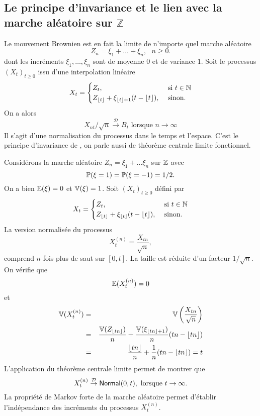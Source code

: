 \subsection{Le principe d'invariance et le lien avec la marche aléatoire sur $\mathbb{Z}$}
Le mouvement Brownien est en fait la limite de n'importe quel marche aléatoire 
$$
Z_n = \xi_1+\ldots+ \xi_n,\text{ }n\geq 0.
$$
dont les incréments $\xi_1,\ldots, \xi_n$ sont \iid de moyenne $0$ et de variance $1$. Soit le processus $(X_t)_{t\geq 0}$ issu d'une interpolation linéaire
$$
X_t = \begin{cases}
Z_t,&\text{ si }t\in \mathbb{N}\\
Z_{\lfloor t\rfloor} + \xi_{\lfloor t\rfloor +1}(t-\lfloor t\rfloor),&\text{ sinon.}
\end{cases}  
$$ 
On a alors 
$$
X_{nt}/\sqrt{n}\overset{\mathcal{D}}{\rightarrow}B_t\text{ lorsque }n\rightarrow \infty
$$
Il s'agit d'une normalisation du processus dans le temps et l'espace. C'est le principe d'invariance de \citet{Donsker1951}, on parle aussi de théorème centrale limite fonctionnel.
\begin{ex}
Considérons la marche aléatoire $Z_n = \xi_1+\ldots \xi_n$ sur $\mathbb{Z}$ avec 
$$
\mathbb{P}(\xi = 1)=\mathbb{P}(\xi = -1) = 1/2.
$$
On a bien $\mathbb{E}(\xi)=0$ et $\mathbb{V}(\xi) = 1$. Soit $(X_t)_{t\geq 0}$ défini par 
$$
X_t = \begin{cases}
Z_t,&\text{ si }t\in \mathbb{N}\\
Z_{\lfloor t\rfloor} + \xi_{\lfloor t\rfloor}(t-\lfloor t\rfloor),&\text{ sinon.}
\end{cases}  
$$ 
La version normalisée du processus 
$$
X_t^{(n)} = \frac{X_{tn}}{\sqrt{n}},
$$
comprend $n$ fois plus de saut sur $[0,t]$. La taille est réduite d'un facteur $1/\sqrt{n}$. On vérifie que 
$$
\mathbb{E}(X_t^{(n)}) = 0
$$
et 
\begin{eqnarray*}
\mathbb{V}(X_t^{(n)}) &=& \mathbb{V}\left(\frac{X_{tn}}{\sqrt{n}}\right)\\
&=& \frac{\mathbb{V}(Z_{\lfloor tn\rfloor})}{n}+\frac{\mathbb{V}(\xi_{\lfloor tn\rfloor +1})}{n}(tn-\lfloor tn\rfloor)\\
&=&\frac{\lfloor tn\rfloor}{n}+\frac{1}{n}(tn-\lfloor tn\rfloor) =  t
\end{eqnarray*}
L'application du théorème centrale limite permet de montrer que 
$$
X_t^{(n)}\overset{\mathcal{D}}{\rightarrow}\mathsf{Normal}(0,t),\text{ lorsque }t\rightarrow \infty.
$$
La propriété de Markov forte de la marche aléatoire permet d'établir l'indépendance des incréments du processus $X_t^{(n)}$. 
\end{ex}
